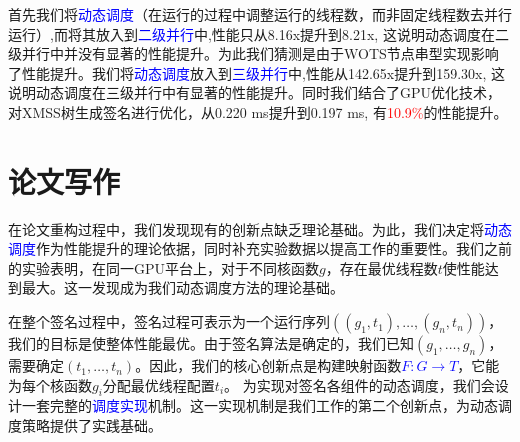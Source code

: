 \documentclass[report]{../../custom}
\begin{document}
首先我们将\textcolor{blue}{动态调度}（在运行的过程中调整运行的线程数，而非固定线程数去并行运行）,而将其放入到\textcolor{blue}{二级并行}中,性能只从8.16x提升到8.21x, 这说明动态调度在二级并行中并没有显著的性能提升。为此我们猜测是由于WOTS节点串型实现影响了性能提升。我们将\textcolor{blue}{动态调度}放入到\textcolor{blue}{三级并行}中,性能从142.65x提升到159.30x, 这说明动态调度在三级并行中有显著的性能提升。同时我们结合了GPU优化技术，对XMSS树生成签名进行优化，从0.220 ms提升到0.197 ms, 有\textcolor{red}{10.9\%}的性能提升。

\section{论文写作}

在论文重构过程中，我们发现现有的创新点缺乏理论基础。为此，我们决定将\textcolor{blue}{动态调度}作为性能提升的理论依据，同时补充实验数据以提高工作的重要性。我们之前的实验表明，在同一GPU平台上，对于不同核函数$g$，存在最优线程数$t$使性能达到最大。这一发现成为我们动态调度方法的理论基础。

在整个签名过程中，签名过程可表示为一个运行序列$((g_1,t_1),\dots,(g_n,t_n))$，我们的目标是使整体性能最优。由于签名算法是确定的，我们已知$(g_1,\dots,g_n)$，需要确定$(t_1,\dots,t_n)$。因此，我们的核心创新点是构建映射函数\textcolor{blue}{$F:G\rightarrow T$}，它能为每个核函数$g_i$分配最优线程配置$t_i$。
为实现对签名各组件的动态调度，我们会设计一套完整的\textcolor{blue}{调度实现}机制。这一实现机制是我们工作的第二个创新点，为动态调度策略提供了实践基础。



\end{document}
